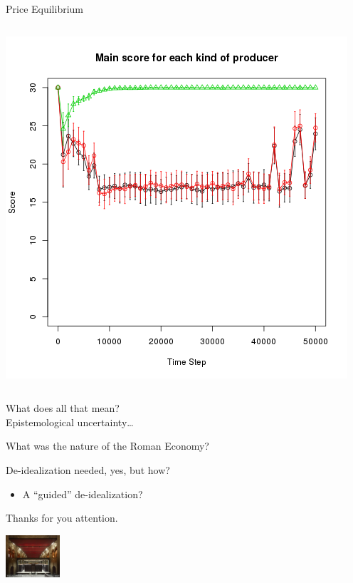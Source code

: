 \documentclass[final]{beamer}
\begin{document}
\begin{frame}
\begin{columns}
\begin{block}{Price Equilibrium}
\begin{columns}
				\includegraphics[width=\textwidth]{./scoreEx2b.png}
			\end{columns}


		\end{block}
	\end{columns}
			What does all that mean?\\

			Epistemological uncertainty\dots
			\vfill
			\begin{center}
				\Huge
				What was the nature of the Roman Economy?\\
			\end{center}
			\vfill

			De-idealization needed, yes, but how?
			\begin{itemize}
				\item A ``guided'' de-idealization? 
			\end{itemize}


			\begin{center}
				Thanks for you attention.\\
				\vfil

				\includegraphics[width=2cm]{./bsc.jpeg}
			\end{center}



\end{frame}
\end{document}
